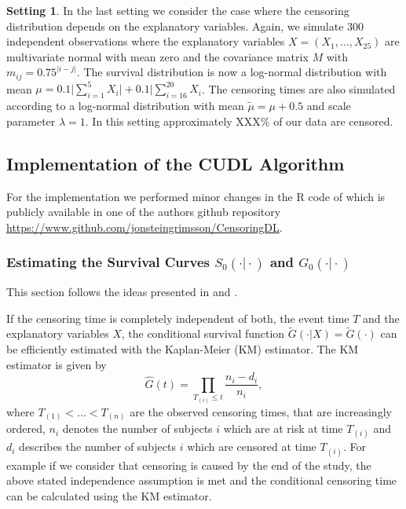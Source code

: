\documentclass[12pt, a4paper]{article}
\theoremstyle{definition}
\newtheorem{setting}{Setting}
\theoremstyle{plain}
\numberwithin{equation}{section}
\numberwithin{figure}{section}
\numberwithin{table}{section}
\begin{document}
	\begin{setting}
		In the last setting we consider the case where the censoring distribution depends on the explanatory variables.
		Again, we simulate 300 independent observations where the explanatory variables $X=(X_1,\dots,X_{25})$ are multivariate normal with mean zero and the covariance matrix $M$ with $m_{ij}=0.75^{\vert i-j\vert}$.
		The survival distribution is now a log-normal distribution with mean $\mu = 0.1 \vert \sum_{i=1}^5 X_i \vert + 0.1 \vert \sum_{i=16}^{20}X_i$.
		The censoring times are also simulated according to a log-normal distribution with mean $\tilde{\mu}=\mu+0.5$ and scale parameter $\lambda = 1$.
		In this setting approximately XXX\% of our data are censored.
	\end{setting}
			
	\subsection{Implementation of the CUDL Algorithm}
	For the implementation we performed minor changes in the R code of \citet*{basearticle} which is publicly available in one of the authors github repository \url{https://www.github.com/jonsteingrimsson/CensoringDL}.
		
	\subsubsection{Estimating the Survival Curves $S_0(\cdot\vert\cdot)$ and $G_0(\cdot\vert\cdot)$}
	This section follows the ideas presented in \citet*{drcut} and \citet*{drtrees}.
	
	If the censoring time is completely independent of both, the event time $T$ and the explanatory variables $X$, the conditional survival function $\tilde{G}(\cdot\vert X)=\tilde{G}(\cdot)$ can be efficiently estimated with the Kaplan-Meier (KM) estimator.
	The KM estimator is given by
	\begin{equation*}
		\hat{G}(t) = \prod_{T_{(i)}\leq t} \frac{n_i-d_i}{n_i},
	\end{equation*}
	where $T_{(1)}<\dots<T_{(n)}$ are the observed censoring times, that are increasingly ordered, $n_i$ denotes the number of subjects $i$ which are at risk at time $T_{(i)}$ and $d_i$ describes the number of subjects $i$ which are censored at time $T_{(i)}$.
	For example if we consider that censoring is caused by the end of the study, the above stated independence assumption is met and the conditional censoring time can be calculated using the KM estimator.
	
\end{document}
